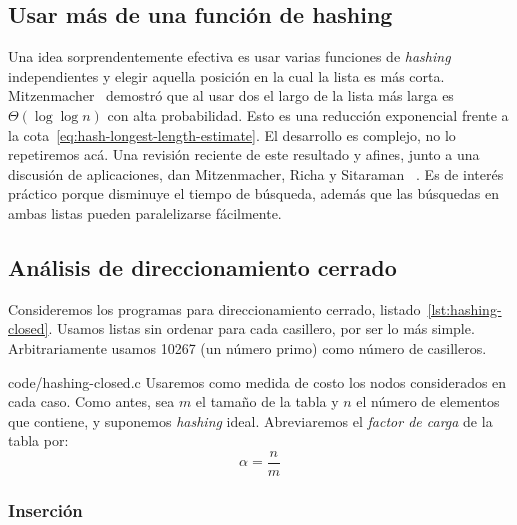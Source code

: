 \subsection{Usar más de una función de hashing}
\label{sec:two-choices}

  Una idea sorprendentemente efectiva
  es usar varias funciones
  de \emph{\foreignlanguage{english}{hashing}} independientes
  y elegir aquella posición en la cual la lista es más corta.
  Mitzenmacher~%
   \cite{mitzenmacher96:_power_two_choic_random_load_balan}
  demostró que al usar dos el largo de la lista más larga
  es \(\Theta(\log \log n)\) con alta probabilidad.
  Esto es una reducción exponencial
  frente a la cota~\eqref{eq:hash-longest-length-estimate}.
  El desarrollo es complejo,
  no lo repetiremos acá.
  Una revisión reciente de este resultado y afines,
  junto a una discusión de aplicaciones,
  dan Mitzenmacher, Richa y Sitaraman~%
   \cite{mitzenmacher01:_power_two_random_choic}.
  Es de interés práctico porque disminuye el tiempo de búsqueda,
  además que las búsquedas en ambas listas pueden paralelizarse fácilmente.

\subsection{Análisis de direccionamiento cerrado}
\label{sec:analisis-cerrado}

  Consideremos los programas para direccionamiento cerrado,
  listado~\ref{lst:hashing-closed}.
  Usamos listas sin ordenar para cada casillero,
  por ser lo más simple.
  Arbitrariamente usamos 10267
  (un número primo)
  como número de casilleros.
  
                  {code/hashing-closed.c}
  Usaremos como medida de costo los nodos considerados en cada caso.
  Como antes,
  sea \(m\) el tamaño de la tabla y \(n\) el número de elementos que contiene,
  y suponemos \emph{\foreignlanguage{english}{hashing}} ideal.
  Abreviaremos
  el \emph{factor de carga} de la tabla por:
  \begin{equation}
    \label{eq:def-alpha}
    \alpha
      = \frac{n}{m}
  \end{equation}

\subsubsection{Inserción}
\label{sec:hashing-cerrado-insercion}

